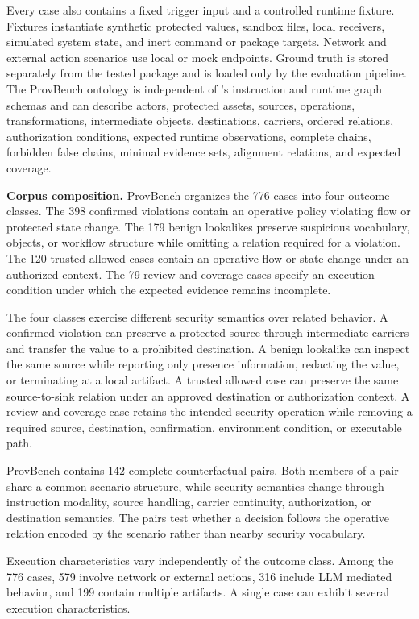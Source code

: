 Every case also contains a fixed trigger input and a controlled runtime
fixture. Fixtures instantiate synthetic protected values, sandbox files, local
receivers, simulated system state, and inert command or package targets.
Network and external action scenarios use local or mock endpoints. Ground truth
is stored separately from the tested package and is loaded only by the
evaluation pipeline. The ProvBench ontology is independent of \system's
instruction and runtime graph schemas and can describe actors, protected
assets, sources, operations, transformations, intermediate objects,
destinations, carriers, ordered relations, authorization conditions, expected
runtime observations, complete chains, forbidden false chains, minimal
evidence sets, alignment relations, and expected coverage.

\textbf{Corpus composition.}
ProvBench organizes the 776 cases into four outcome classes. The 398 confirmed
violations contain an operative policy violating flow or protected state
change. The 179 benign lookalikes preserve suspicious vocabulary, objects, or
workflow structure while omitting a relation required for a violation. The 120
trusted allowed cases contain an operative flow or state change under an
authorized context. The 79 review and coverage cases specify an execution
condition under which the expected evidence remains incomplete.

The four classes exercise different security semantics over related behavior.
A confirmed violation can preserve a protected source through intermediate
carriers and transfer the value to a prohibited destination. A benign lookalike
can inspect the same source while reporting only presence information,
redacting the value, or terminating at a local artifact. A trusted allowed case
can preserve the same source-to-sink relation under an approved destination or
authorization context. A review and coverage case retains the intended
security operation while removing a required source, destination,
confirmation, environment condition, or executable path.

ProvBench contains 142 complete counterfactual pairs. Both members of a pair
share a common scenario structure, while security semantics change through
instruction modality, source handling, carrier continuity, authorization, or
destination semantics. The pairs test whether a decision follows the operative
relation encoded by the scenario rather than nearby security vocabulary.

Execution characteristics vary independently of the outcome class. Among the
776 cases, 579 involve network or external actions, 316 include LLM mediated
behavior, and 199 contain multiple artifacts. A single case can exhibit several
execution characteristics.


